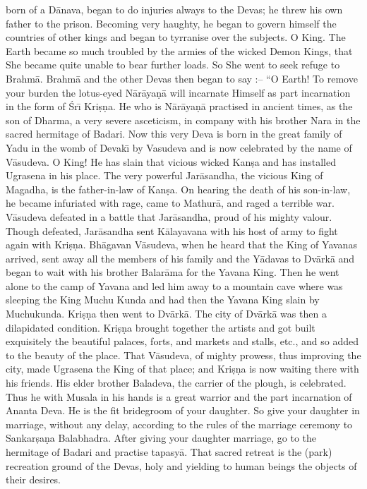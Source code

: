 born of a D\=anava, began to do injuries always to the Devas; he threw his own father to the prison. Becoming very haughty, he began to govern himself the countries of other kings and began to tyrranise over the subjects. O King. The Earth became so much troubled by the armies of the wicked Demon Kings, that She became quite unable to bear further loads. So She went to seek refuge to Brahm\=a. Brahm\=a and the other Devas then began to say :-- ``O Earth! To remove your burden the lotus-eyed N\=ar\=aya\d{n}\=a will incarnate Himself as part incarnation in the form of \'Sr\={\i} Kri\d{s}\d{n}a. He who is N\=ar\=aya\d{n}\=a practised in ancient times, as the son of Dharma, a very severe asceticism, in company with his brother Nara in the sacred hermitage of Badari. Now this very Deva is born in the great family of Yadu in the womb of Devak\={\i} by Vasudeva and is now celebrated by the name of V\=asudeva. O King! He has slain that vicious wicked Kan\d{s}a and has installed Ugrasena in his place. The very powerful Jar\=asandha, the vicious King of Magadha, is the father-in-law of Kan\d{s}a. On hearing the death of his son-in-law, he became infuriated with rage, came to Mathur\=a, and raged a terrible war. V\=asudeva defeated in a battle that Jar\=asandha, proud of his mighty valour. Though defeated, Jar\=asandha sent K\=alayavana with his host of army to fight again with Kri\d{s}\d{n}a. Bh\=agavan V\=asudeva, when he heard that the King of Yavanas arrived, sent away all the members of his family and the Y\=adavas to Dv\=ark\=a and began to wait with his brother Balar\=ama for the Yavana King. Then he went alone to the camp of Yavana and led him away to a mountain cave where was sleeping the King Muchu Kunda and had then the Yavana King slain by Muchukunda. Kri\d{s}\d{n}a then went to Dv\=ark\=a. The city of Dv\=ark\=a was then a dilapidated condition. Kri\d{s}\d{n}a brought together the artists and got built exquisitely the beautiful palaces, forts, and markets and stalls, etc., and so added to the beauty of the place. That V\=asudeva, of mighty prowess, thus improving the city, made Ugrasena the King of that place; and Kri\d{s}\d{n}a is now waiting there with his friends. His elder brother Baladeva, the carrier of the plough, is celebrated. Thus he with Musala in his hands is a great warrior and the part incarnation of Ananta Deva. He is the fit bridegroom of your daughter. So give your daughter in marriage, without any delay, according to the rules of the marriage ceremony to Sankar\d{s}a\d{n}a Balabhadra. After giving your daughter marriage, go to the hermitage of Badari and practise tapasy\=a. That sacred retreat is the (park) recreation ground of the Devas, holy and yielding to human beings the objects of their desires.

